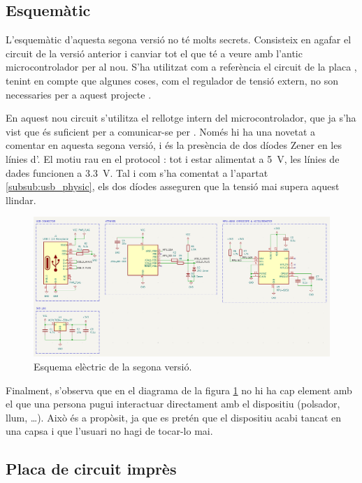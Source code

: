\subsection{Esquemàtic}

L'esquemàtic d'aquesta segona versió no té molts secrets. Consisteix en agafar
el circuit de la versió anterior i canviar tot el que té a veure amb l'antic
microcontrolador per al nou. S'ha utilitzat com a referència el circuit de la
placa , tenint en compte que algunes coses, com el regulador de
tensió extern, no son necessaries per a aquest projecte \cite{Digispark}.

En aquest nou circuit s'utilitza el rellotge intern del microcontrolador, que
ja s'ha vist que és suficient per a comunicar-se per . Només hi ha
una novetat a comentar en aquesta segona versió, i és la presència de dos
díodes Zener en les línies d'. El motiu rau en el protocol :
tot i estar alimentat a \SI[round-mode=places,round-precision=0]{5}{\volt},
les línies de dades funcionen a
\SI[round-mode=places,round-precision=1]{3.3}{\volt}. Tal i com
s'ha comentat a l'apartat \ref{subsub:usb_physic}, els dos díodes asseguren
que la tensió mai supera aquest llindar.

\begin{figure}[ht]
    \centering
    \includegraphics[width=1\textwidth]{images/kicad/gyro2_sch.png}
    \caption{Esquema elèctric de la segona versió.}
    \label{fig:sch_v2}
\end{figure}

Finalment, s'observa que en el diagrama de la figura \ref{fig:sch_v2}
no hi ha cap element amb el que una
persona pugui interactuar directament amb el dispositiu (polsador, llum, \dots).
Això és a propòsit, ja que es pretén que el dispositiu acabi tancat en una capsa
i que l'usuari no hagi de tocar-lo mai.

\subsection{Placa de circuit imprès}

